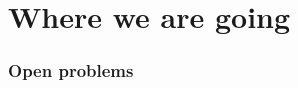 \documentclass[presentation]{beamer}\mode<presentation>{\usetheme{blackAMSBolognaFC}}
\begin{document}
\section{Where we are going}

\begin{frame}%
\frametitle{Open problems}



\end{frame}

\section*{}
\frame{\titlepage}

\section*{\bibname}

\end{document}
